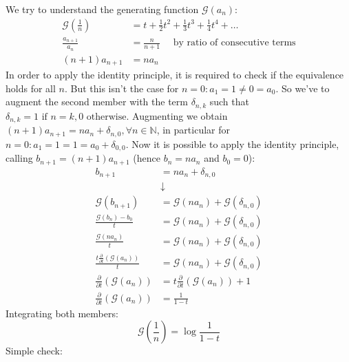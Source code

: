 We try to understand the generating function $\mathcal{G}(a_n) $:
\begin{displaymath}
  \begin{split}
    \mathcal{G} ( \frac{1}{n} ) &= t + \frac{1}{2} t^2 +  \frac{1}{3}
    t^3 +  \frac{1}{4} t^4 + \ldots \\
     \frac{a_{n+1}}{a_n} &=  \frac{n}{n+1} \quad \text{ by ratio of
       consecutive terms}\\
      (n+1)a_{n+1}  &= n a_n
  \end{split}
\end{displaymath}
In order to apply the identity principle, it is required to check if
the equivalence holds for all $n$. But this isn't the case for
$n=0:a_{1} = 1 \not = 0 = a_0$. So we've to augment the second member
with the term $\delta_{n,k}$ such that $\delta_{n,k} = 1 \text{ if }
n=k, 0 \text{ otherwise}$. Augmenting we obtain $(n+1)a_{n+1} = n a_n
+ \delta_{n,0}, \forall n \in \mathbb{N} $, in particular for
$n=0:a_{1} = 1 = 1 = a_0 + \delta_{0,0}$. Now it is possible to apply
the identity principle, calling $b_{n+1} = (n+1)a_{n+1}$ (hence $b_n
=n a_n$ and $b_0 = 0$):
\begin{displaymath}
  \begin{split}
    b_{n+1} &= n a_n + \delta_{n,0} \\
    &\downarrow \\
    \mathcal{G} (b_{n+1}) &= \mathcal{G} (n a_n) + \mathcal{G}
    (\delta_{n,0}) \\
    \frac{\mathcal{G} (b_n) - b_0}{t} &= \mathcal{G} (n a_n) +
    \mathcal{G}
    (\delta_{n,0}) \\
    \frac{\mathcal{G} (n a_n)}{t} &= \mathcal{G} (n a_n) + \mathcal{G}
    (\delta_{n,0}) \\
    \frac{t \frac{\partial}{\partial t}\left( \mathcal{G} (a_n)
      \right) }{t} &= \mathcal{G} (n a_n) + \mathcal{G}
    (\delta_{n,0}) \\
    \frac{\partial}{\partial t}\left( \mathcal{G} (a_n) \right) &= t
    \frac{\partial}{\partial t}\left( \mathcal{G} (a_n) \right) + 1 \\
    \frac{\partial}{\partial t}\left( \mathcal{G} (a_n) \right) &=
    \frac{1}{1-t}
  \end{split}
\end{displaymath}
Integrating both members:
\begin{equation}
  \label{eq:one-above-n-gen-function}
  \mathcal{G} ( \frac{1}{n} ) = \log{ \frac{1}{1-t} }
\end{equation}
Simple check:


